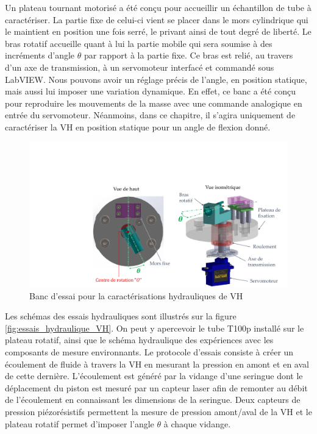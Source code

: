 Un plateau tournant motorisé a été conçu pour accueillir un échantillon de tube à caractériser. La partie fixe de celui-ci vient se placer dans le mors cylindrique qui le maintient en position une fois serré, le privant ainsi de tout degré de liberté. Le bras rotatif accueille quant à lui la partie mobile qui sera soumise à des incréments d'angle $\theta$ par rapport à la partie fixe. Ce bras est relié, au travers d'un axe de transmission, à un servomoteur interfacé et commandé sous LabVIEW. Nous pouvons avoir un réglage précis de l'angle, en position statique, mais aussi lui imposer une variation dynamique. En effet, ce banc a été conçu pour reproduire les mouvements de la masse avec une commande analogique en entrée du servomoteur. Néanmoins, dans ce chapitre, il s'agira uniquement de caractériser la VH en position statique pour un angle de flexion donné.
\begin{figure}[!htb]
\begin{center}
    \captionsetup{justification=centering} 
	\includegraphics[trim={8cm 0cm 0cm 5cm},clip,width=\textwidth]{../Chap4/Figure/BDT_hydraulique_VH.pdf}
	\caption{Banc d'essai pour la caractérisations hydrauliques de VH}
	\label{fig:BDT_hydraulique_VH}
\end{center}	
\end{figure}    

Les schémas des essais hydrauliques sont illustrés sur la figure \ref{fig:essais_hydraulique_VH}. On peut y apercevoir le tube T100p installé sur le plateau rotatif, ainsi que le schéma hydraulique des expériences avec les composants de mesure environnants. Le protocole d'essais consiste à créer un écoulement de fluide à travers la VH en mesurant la pression en amont et en aval de cette dernière. L'écoulement est généré par la vidange d'une seringue dont le déplacement du piston est mesuré par un capteur laser afin de remonter au débit de l'écoulement en connaissant les dimensions de la seringue. Deux capteurs de pression piézorésistifs permettent la mesure de pression amont/aval de la VH et le plateau rotatif permet d'imposer l'angle $\theta$ à chaque vidange.

